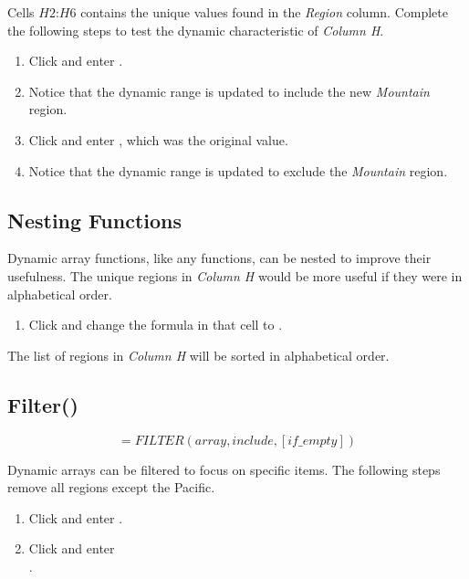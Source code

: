 Cells $ H2 $:$ H6 $ contains the unique values found in the \textit{Region} column. Complete the following steps to test the dynamic characteristic of \textit{Column H}.

\begin{enumbox}
	\begin{enumerate}
		\item Click  and enter .
		\item Notice that the dynamic range  is updated to include the new \textit{Mountain} region. 
		\item Click  and enter , which was the original value.
		\item Notice that the dynamic range  is updated to exclude the \textit{Mountain} region.		
	\end{enumerate}
\end{enumbox}

\subsection{Nesting Functions}

Dynamic array functions, like any functions, can be nested to improve their usefulness. The unique regions in \textit{Column H} would be more useful if they were in alphabetical order.

\begin{enumbox}
	\begin{enumerate}
		\item Click  and change the formula in that cell to .
	\end{enumerate}
\end{enumbox}

The list of regions in \textit{Column H} will be sorted in alphabetical order.

\subsection{Filter()}

\[ =FILTER(array,include,[if\_empty]) \]

Dynamic arrays can be filtered to focus on specific items. The following steps remove all regions except the Pacific.

\begin{enumbox}
	\begin{enumerate}
		\item Click  and enter .
		\item Click  and enter\\ . 
	\end{enumerate}
\end{enumbox}

